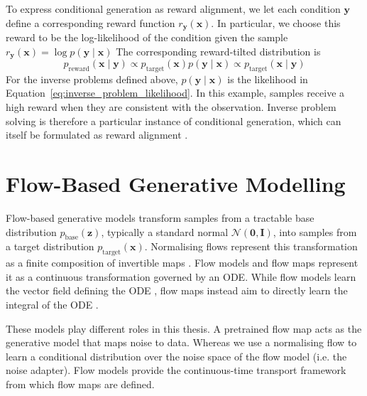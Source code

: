 \documentclass[12pt,a4paper]{report}
\begin{document}
To express conditional generation as reward alignment, we let each condition $\mathbf{y}$ define a corresponding reward function $r_{\mathbf{y}}(\mathbf{x})$. In particular, we choose this reward to be the log-likelihood of the condition given the sample $r_{\mathbf{y}}(\mathbf{x}) = \log p(\mathbf{y}\mid\mathbf{x})$
The corresponding reward-tilted distribution is
\begin{equation}
p_{\mathrm{reward}}(\mathbf{x}\mid\mathbf{y})
\propto
p_{\mathrm{target}}(\mathbf{x})
p(\mathbf{y}\mid\mathbf{x})
\propto
p_{\mathrm{target}}(\mathbf{x}\mid\mathbf{y})
\label{eq:conditional_generation_as_reward_alignment}
\end{equation}
For the inverse problems defined above, $p(\mathbf{y}\mid\mathbf{x})$ is the likelihood in Equation~\ref{eq:inverse_problem_likelihood}. In this example, samples receive a high reward when they are consistent with the observation. Inverse problem solving is therefore a particular instance of conditional generation, which can itself be formulated as reward alignment \parencite{VFM}.

\section{Flow-Based Generative Modelling}
\label{sec:flow_based_generative_modelling}
Flow-based generative models transform samples from a tractable base distribution $p_{\mathrm{base}}(\mathbf{z})$, typically a standard normal $\mathcal{N}(\mathbf{0},\mathbf{I})$, into samples from a target distribution $p_{\mathrm{target}}(\mathbf{x})$.
Normalising flows represent this transformation as a finite composition of invertible maps \parencite{NF_survey}. Flow models and flow maps represent it as a continuous transformation governed by an ODE. While flow models learn the vector field defining the ODE \parencite{lipman_FM,mit_FM}, flow maps instead aim to directly learn the integral of the ODE \parencite{sander_MF}.

These models play different roles in this thesis. A pretrained flow map acts as the generative model that maps noise to data. Whereas we use a normalising flow to learn a conditional distribution over the noise space of the flow model (i.e. the noise adapter). Flow models provide the continuous-time transport framework from which flow maps are defined.
\end{document}
